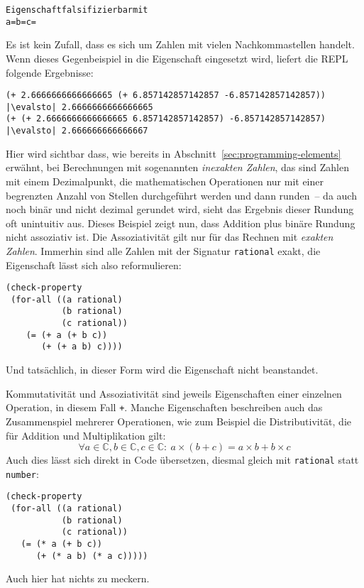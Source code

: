 %
\begin{alltt}
Eigenschaft falsifizierbar mit
  a =  b =  c = 
\end{alltt}
%
Es ist kein Zufall, dass es sich um Zahlen mit vielen Nachkommastellen
handelt.  Wenn dieses Gegenbeispiel in die Eigenschaft eingesetzt
wird, liefert die REPL folgende Ergebnisse:
%
\begin{lstlisting}
(+ 2.6666666666666665 (+ 6.857142857142857 -6.857142857142857))
|\evalsto| 2.6666666666666665
(+ (+ 2.6666666666666665 6.857142857142857) -6.857142857142857)
|\evalsto| 2.666666666666667
\end{lstlisting}
%
Hier wird sichtbar dass, wie bereits in
Abschnitt~\ref{sec:programming-elements} erwähnt, bei Berechnungen mit
sogenannten \textit{inexakten Zahlen}, das sind
Zahlen mit einem Dezimalpunkt, die mathematischen Operationen nur mit
einer begrenzten Anzahl von Stellen durchgeführt werden und dann runden~-- da
auch noch binär und nicht dezimal gerundet wird, sieht das Ergebnis
dieser Rundung oft unintuitiv aus.  Dieses Beispiel zeigt nun, dass
Addition plus binäre Rundung nicht assoziativ ist.  Die Assoziativität
gilt nur für das Rechnen mit \textit{exakten Zahlen}.  Immerhin sind alle Zahlen mit der Signatur
\lstinline{rational} exakt, die
Eigenschaft lässt sich also reformulieren:
%
\begin{lstlisting}
(check-property
 (for-all ((a rational)
           (b rational)
           (c rational))
    (= (+ a (+ b c))
       (+ (+ a b) c))))
\end{lstlisting}
%
Und tatsächlich, in dieser Form wird die Eigenschaft nicht
beanstandet.

Kommutativität und Assoziativität sind jeweils Eigenschaften einer
einzelnen Operation, in diesem Fall \lstinline{+}.  Manche Eigenschaften
beschreiben auch das Zusammenspiel mehrerer Operationen, wie zum
Beispiel die Distributivität, die für Addition und Multiplikation
gilt:
%
\begin{displaymath}
\forall a \in \mathbb{C}, b \in \mathbb{C}, c \in \mathbb{C}:\
a\times(b+c) = a\times b + b\times c
\end{displaymath}
%
Auch dies lässt sich direkt in Code übersetzen, diesmal gleich mit
\lstinline{rational} statt \lstinline{number}:
%
\begin{lstlisting}
(check-property
 (for-all ((a rational)
           (b rational)
           (c rational))
   (= (* a (+ b c))
      (+ (* a b) (* a c)))))
\end{lstlisting}
%
Auch hier hat \drscheme{} nichts zu meckern.

